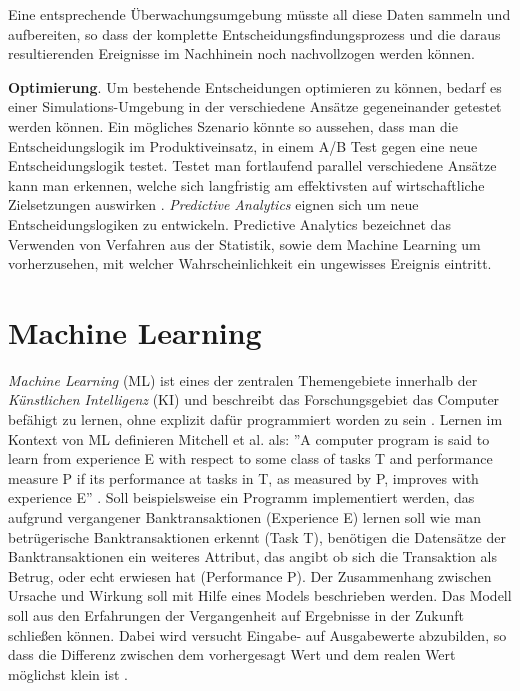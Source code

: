 Eine entsprechende Überwachungsumgebung müsste all diese Daten sammeln und aufbereiten, so dass der komplette Entscheidungsfindungsprozess und die daraus resultierenden Ereignisse im Nachhinein noch nachvollzogen werden können.

\textbf{Optimierung}. Um bestehende Entscheidungen optimieren zu können, bedarf es einer Simulations-Umgebung in der verschiedene Ansätze gegeneinander getestet werden können. Ein mögliches Szenario könnte so aussehen, dass man die Entscheidungslogik im Produktiveinsatz, in einem A/B Test gegen eine neue Entscheidungslogik testet. Testet man fortlaufend parallel verschiedene Ansätze kann man erkennen, welche sich langfristig am effektivsten auf wirtschaftliche Zielsetzungen auswirken \cite[vgl. S. 173]{JT11}. \emph{Predictive Analytics} eignen sich um neue Entscheidungslogiken zu entwickeln. Predictive Analytics bezeichnet \cite[vgl. S. 5]{BG15} das Verwenden von Verfahren aus der Statistik, sowie dem Machine Learning um vorherzusehen, mit welcher Wahrscheinlichkeit ein ungewisses Ereignis eintritt.   
  
\section{Machine Learning}
\label{sec:Machine_Learning2}

\emph{Machine Learning} (ML) ist eines der zentralen Themengebiete innerhalb der  \emph{Künstlichen Intelligenz} (KI) \cite[vgl. S. 2082]{JW12} und beschreibt das Forschungsgebiet das Computer befähigt zu lernen, ohne explizit dafür programmiert worden zu sein \cite[vgl. S. 1]{AM14}. Lernen im Kontext von ML definieren Mitchell et al. als: ''A computer program is said to learn from experience E with respect to some class of tasks T and performance measure P if its performance at tasks in T, as measured by P, improves with experience E'' \cite{MT97}. Soll beispielsweise ein Programm implementiert werden, das aufgrund vergangener Banktransaktionen (Experience E) lernen soll wie man betrügerische Banktransaktionen erkennt (Task T), benötigen die Datensätze der Banktransaktionen ein weiteres Attribut, das angibt ob sich die Transaktion als Betrug, oder echt erwiesen hat (Performance P).        Der Zusammenhang zwischen Ursache und Wirkung soll mit Hilfe eines Models beschrieben werden. Das Modell soll aus den Erfahrungen der Vergangenheit auf Ergebnisse in der Zukunft schließen können. Dabei wird versucht Eingabe- auf Ausgabewerte abzubilden, so dass die Differenz zwischen dem vorhergesagt Wert und dem realen Wert möglichst klein ist \cite[vgl. S. 68]{EM17}. 

